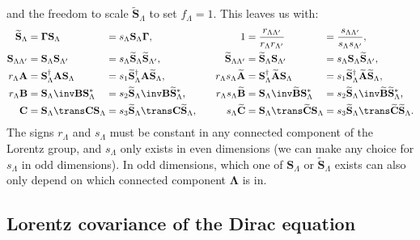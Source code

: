 \documentclass[11pt]{article}
\newcommand{\cc}{^\ast}
\newcommand{\hc}{^\dag}
\newcommand{\Gammab}{\boldsymbol{\Gamma}}
\renewcommand{\S}{\mathbf{S}}
\newcommand{\A}{\mathbf{A}}
\newcommand{\B}{\mathbf{B}}
\renewcommand{\C}{\mathbf{C}}
\newcommand{\At}{\widetilde{\A}}
\newcommand{\Bt}{\widetilde{\B}}
\newcommand{\Ct}{\widetilde{\C}}
\newcommand{\St}{\widetilde{\S}}
\newcommand{\Lambdab}{\boldsymbol{\Lambda}}
\begin{document}
and the freedom to scale \(\St_\Lambda\) to set \(f_\Lambda = 1\).
This leaves us with:
%
\begin{equation}\label{eq:constnormlorentz}
\begin{alignedat}{4}
  \St_\Lambda
    &= \Gammab \S_\Lambda 
    &&= s_\Lambda \S_\Lambda \Gammab
    ,&
  1 &=\frac{r_{\Lambda\Lambda'}}{r_{\Lambda} r_{\Lambda'}}
    &&= \frac{s_{\Lambda\Lambda'}}{s_{\Lambda} s_{\Lambda'}}
    ,\\
  \S_{\Lambda\Lambda'}
    &= \S_\Lambda \S_{\Lambda'} 
    &&= s_{\Lambda} \St_\Lambda \St_{\Lambda'} 
    ,&
  \St_{\Lambda\Lambda'}
    &= \St_\Lambda \S_{\Lambda'}
    &&= s_{\Lambda} \S_\Lambda \St_{\Lambda'} 
    ,\\ 
  r_\Lambda \A
    &= \S_\Lambda\hc \A \S_\Lambda 
    &&= s_1 \St_\Lambda\hc \A \St_\Lambda 
    ,&
  r_\Lambda s_\Lambda \At
    &= \S_\Lambda\hc \At \S_\Lambda 
    &&= s_1 \St_\Lambda\hc \At \St_\Lambda 
    ,\\
  r_\Lambda \B
    &= \S_\Lambda\inv \B \S_\Lambda\cc 
    &&= s_2 \St_\Lambda\inv \B \St_\Lambda\cc 
    ,&\qquad
  r_\Lambda s_\Lambda \Bt
    &= \S_\Lambda\inv \Bt \S_\Lambda\cc 
    &&= s_2 \St_\Lambda\inv \Bt \St_\Lambda\cc
    ,\\ 
  \C
    &= \S_\Lambda\trans \C \S_\Lambda 
    &&= s_3 \St_\Lambda\trans \C \St_\Lambda
    ,& 
  s_\Lambda \Ct 
    &= \S_\Lambda\trans \Ct \S_\Lambda 
    &&= s_3 \St_\Lambda\trans \Ct \St_\Lambda
    .
\end{alignedat}
\end{equation}
%
The signs \(r_\Lambda\) and \(s_\Lambda\) must be constant in any connected component of the Lorentz group,
and \(s_\Lambda\) only exists in even dimensions 
(we can make any choice for \(s_\Lambda\)  in odd dimensions).
In odd dimensions, which one of \(\S_\Lambda\) or \(\St_\Lambda\) exists can also only depend on which connected component \(\Lambdab\) is in.
  

\subsection{Lorentz covariance of the Dirac equation}\label{sec:diraclorentz}
\end{document}

